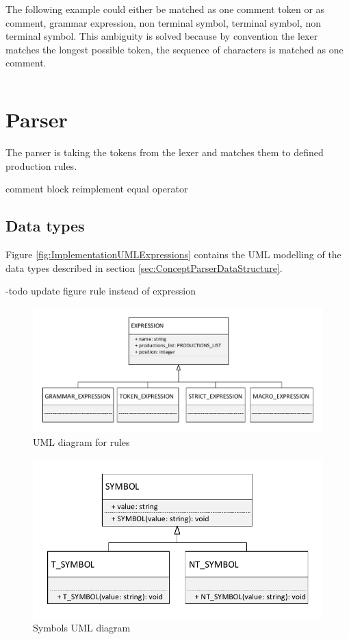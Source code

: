 The following example could either be matched as one comment token or as comment, grammar expression, non terminal symbol, terminal symbol, non terminal symbol.
This ambiguity is solved because by convention the lexer matches the longest possible token, the sequence of characters is matched as one comment.
\begin{lstlisting}[basicstyle=\scriptsize	,caption= Commented out production rule,label= lst:Lexer_example]
%----   <formula_role> ::= <user_role>-<source>
\end{lstlisting}
\section{Parser}\label{sec:ImplementationParser}

The parser is taking the tokens from the lexer and matches them to defined production rules.




comment block reimplement equal operator

\subsection{Data types}\label{sec:ImplementationDataTypes}

Figure \ref{fig:ImplementationUMLExpressions} contains the UML modelling of the data types described in section \ref{sec:ConceptParserDataStructure}.

-todo update figure rule instead of expression
\begin{figure}[H]
\centering
\includegraphics[width=1\textwidth]{images/uml_data_types_expressions.pdf}
\caption{UML diagram for rules}
\label{fig:ImplementationUMLRule}
\end{figure}


\begin{figure}[H]
\centering
\includegraphics[width=.7\textwidth]{images/Implementation_parser_symbol_uml.pdf}
\caption{Symbols UML diagram}
\label{fig:ImplementationUMLSymbols}
\end{figure}


